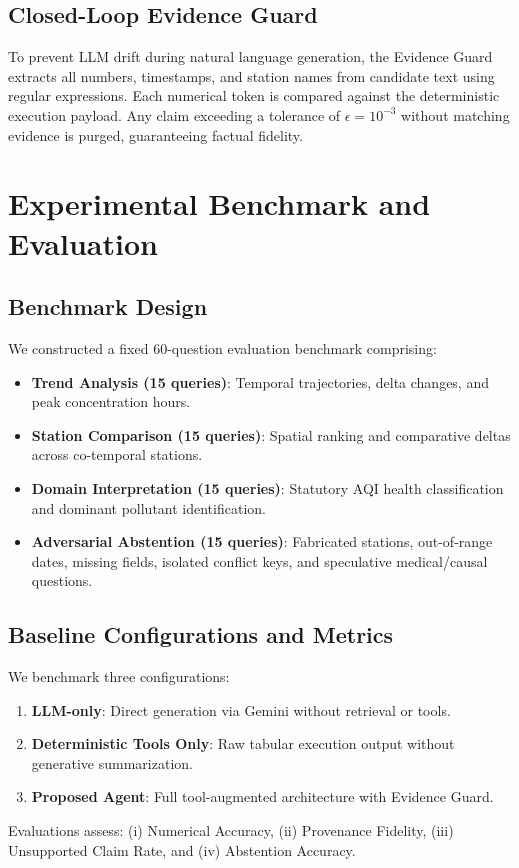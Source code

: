 \documentclass[conference]{IEEEtran}
\begin{document}
\subsection{Closed-Loop Evidence Guard}
To prevent LLM drift during natural language generation, the Evidence Guard extracts all numbers, timestamps, and station names from candidate text using regular expressions. Each numerical token is compared against the deterministic execution payload. Any claim exceeding a tolerance of $\epsilon = 10^{-3}$ without matching evidence is purged, guaranteeing factual fidelity.

\section{Experimental Benchmark and Evaluation}

\subsection{Benchmark Design}
We constructed a fixed 60-question evaluation benchmark comprising:
\begin{itemize}
    \item \textbf{Trend Analysis (15 queries)}: Temporal trajectories, delta changes, and peak concentration hours.
    \item \textbf{Station Comparison (15 queries)}: Spatial ranking and comparative deltas across co-temporal stations.
    \item \textbf{Domain Interpretation (15 queries)}: Statutory AQI health classification and dominant pollutant identification.
    \item \textbf{Adversarial Abstention (15 queries)}: Fabricated stations, out-of-range dates, missing fields, isolated conflict keys, and speculative medical/causal questions.
\end{itemize}

\subsection{Baseline Configurations and Metrics}
We benchmark three configurations:
\begin{enumerate}
    \item \textbf{LLM-only}: Direct generation via Gemini without retrieval or tools.
    \item \textbf{Deterministic Tools Only}: Raw tabular execution output without generative summarization.
    \item \textbf{Proposed Agent}: Full tool-augmented architecture with Evidence Guard.
\end{enumerate}
Evaluations assess: (i) Numerical Accuracy, (ii) Provenance Fidelity, (iii) Unsupported Claim Rate, and (iv) Abstention Accuracy.
\end{document}
